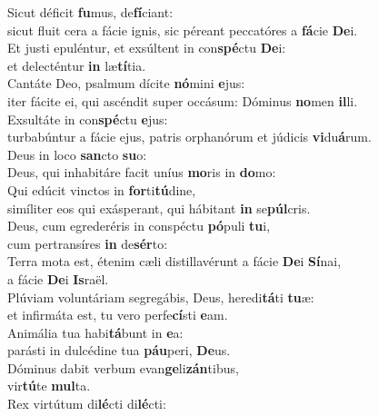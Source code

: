 \evenverse Sicut déficit \textbf{fu}mus, de\textbf{fí}ciant:~\*\\
\evenverse sicut fluit cera a fácie ignis, sic péreant peccatóres a \textbf{fá}cie \textbf{De}i.\\
\oddverse Et justi epuléntur, et exsúltent in con\textbf{spé}ctu \textbf{De}i:~\*\\
\oddverse et delecténtur \textbf{in} læ\textbf{tí}tia.\\
\evenverse Cantáte Deo, psalmum dícite \textbf{nó}mini \textbf{e}jus:~\*\\
\evenverse iter fácite ei, qui ascéndit super occásum: Dóminus \textbf{no}men \textbf{il}li.\\
\oddverse Exsultáte in con\textbf{spé}ctu \textbf{e}jus:~\*\\
\oddverse turbabúntur a fácie ejus, patris orphanórum et júdicis \textbf{vi}du\textbf{á}rum.\\
\evenverse Deus in loco \textbf{san}cto \textbf{su}o:~\*\\
\evenverse Deus, qui inhabitáre facit uníus \textbf{mo}ris in \textbf{do}mo:\\
\oddverse Qui edúcit vinctos in \textbf{for}ti\textbf{tú}dine,~\*\\
\oddverse simíliter eos qui exásperant, qui hábitant \textbf{in} se\textbf{púl}cris.\\
\evenverse Deus, cum egrederéris in conspéctu \textbf{pó}puli \textbf{tu}i,~\*\\
\evenverse cum pertransíres \textbf{in} de\textbf{sér}to:\\
\oddverse Terra mota est, étenim cæli distillavérunt a fácie \textbf{De}i \textbf{Sí}nai,~\*\\
\oddverse a fácie \textbf{De}i \textbf{Is}raël.\\
\evenverse Plúviam voluntáriam segregábis, Deus, heredi\textbf{tá}ti \textbf{tu}æ:~\*\\
\evenverse et infirmáta est, tu vero perfe\textbf{cí}sti \textbf{e}am.\\
\oddverse Animália tua habi\textbf{tá}bunt in \textbf{e}a:~\*\\
\oddverse parásti in dulcédine tua \textbf{páu}peri, \textbf{De}us.\\
\evenverse Dóminus dabit verbum evan\textbf{ge}li\textbf{zán}tibus,~\*\\
\evenverse vir\textbf{tú}te \textbf{mul}ta.\\
\oddverse Rex virtútum di\textbf{lé}cti di\textbf{lé}cti:~\*\\
